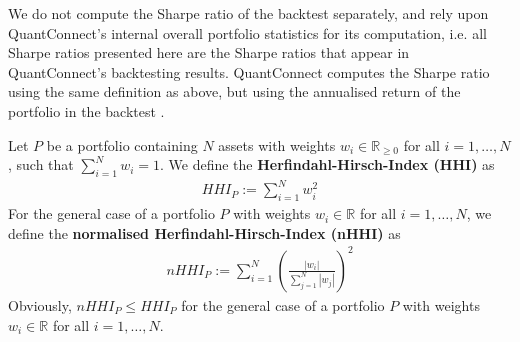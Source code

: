         \begin{remark}
            We do not compute the Sharpe ratio of the backtest separately, and rely upon QuantConnect's internal overall portfolio statistics for its computation, i.e. all Sharpe ratios presented here are the Sharpe ratios that appear in QuantConnect's backtesting results. QuantConnect computes the Sharpe ratio using the same definition as above, but using the annualised return of the portfolio in the backtest \cite{qcsharperatiocode}.
        \end{remark}
        
        
        
        
        \begin{definition} %
            Let $P$ be a portfolio containing $N$ assets with weights $w_i \in \mathbb{R}_{\geq 0}$ for all $i=1, \dots, N$, such that $\sum_{i=1}^N w_i = 1$. We define the \textbf{Herfindahl-Hirsch-Index (HHI)} as
            \begin{align*}
                HHI_P := \sum_{i=1}^N w_i^2
            \end{align*}
            For the general case of a portfolio $P$ with weights $w_i \in \mathbb{R}$ for all $i = 1, \dots, N$, we define the \textbf{normalised Herfindahl-Hirsch-Index (nHHI)} as
            \begin{align*}
                nHHI_P := \sum_{i=1}^N \left( \frac{|w_i|}{\sum_{j=1}^N |w_j|}\right)^2
            \end{align*}
            Obviously, $nHHI_P \leq HHI_P$ for the general case of a portfolio $P$ with weights $w_i \in \mathbb{R}$ for all $i = 1, \dots, N$.
        \end{definition}
        
